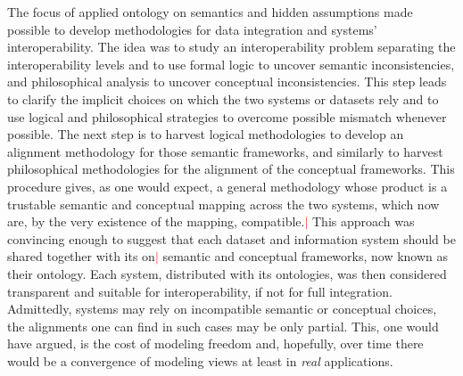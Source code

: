 \documentclass[ao]{iosart2x}
\newcommand{\nb}[1]{\textcolor{red}{$|$}\marginpar{\hspace*{-0cm}\parbox{20mm}{\scriptsize\raggedright\textcolor{red}{#1}}}}
\begin{document}
The focus of applied ontology on semantics and hidden assumptions made possible to develop methodologies for data integration and systems' interoperability. The idea was to study an interoperability problem separating the interoperability levels and to use formal logic to uncover semantic inconsistencies, and philosophical analysis to uncover conceptual inconsistencies. 
This step leads to clarify the implicit choices on which the two systems or datasets rely and to use logical and philosophical strategies to overcome possible mismatch whenever possible. The next step is to harvest logical methodologies to develop an alignment methodology for those semantic frameworks, and similarly to harvest philosophical methodologies for the alignment of the conceptual frameworks. 
This procedure gives, as one would expect, a general methodology whose product is a trustable semantic and conceptual mapping across the two systems, which now are, by the very existence of the mapping, compatible.\nb{CM: questo claim mi sembra forte, dipende dal significato di mapping} 
This approach was convincing enough to suggest that each dataset and information system should be shared together with its on\nb{CM: own ?} semantic and conceptual frameworks, now known as their ontology. Each system, distributed with its ontologies, was then considered transparent and suitable for interoperability, if not for full integration. 
Admittedly, systems may rely on incompatible semantic or conceptual choices, the alignments one can find in such cases may be only partial. This, one would have argued, is the cost of modeling freedom and, hopefully, over time there would be a convergence of modeling views at least in {\em real} applications.
\end{document}
